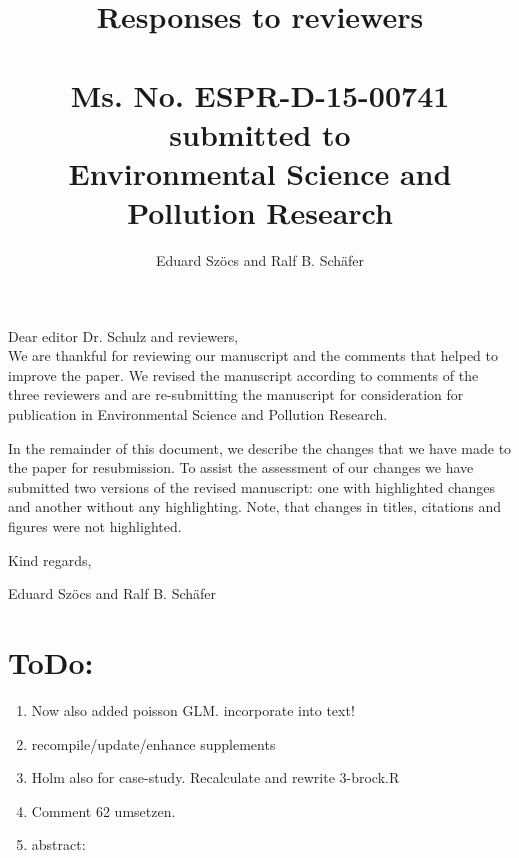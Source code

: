 \documentclass[12pt]{article}
\begin{document}
\title{Responses to reviewers\\~\\Ms. No. ESPR-D-15-00741\\submitted to\\Environmental Science and Pollution Research}

\author{Eduard Szöcs and Ralf B. Schäfer}

\maketitle
\noindent Dear editor Dr. Schulz  and reviewers,\\

We are thankful for reviewing our manuscript and the comments that helped to improve the paper. 
We revised the manuscript according to comments of the three reviewers and are re-submitting the manuscript for consideration for publication in Environmental Science and Pollution Research. 

In the remainder of this document, we describe the changes that we have made to the paper for resubmission. 
To assist the assessment of our changes we have submitted two versions of the revised manuscript: one with highlighted changes and another without any highlighting. 
Note, that changes in titles, citations and figures were not highlighted.

\vspace{2em}
\hfill Kind regards,

\hfill Eduard Szöcs and Ralf B. Schäfer

\newpage
\section{ToDo:}
\begin{enumerate}
	\item Now also added poisson GLM. incorporate into text!
	\item recompile/update/enhance supplements
	\item Holm also for case-study. Recalculate and rewrite 3-brock.R
	\item Comment 62 umsetzen.
	\item abstract: 
\end{enumerate}


\end{document}
